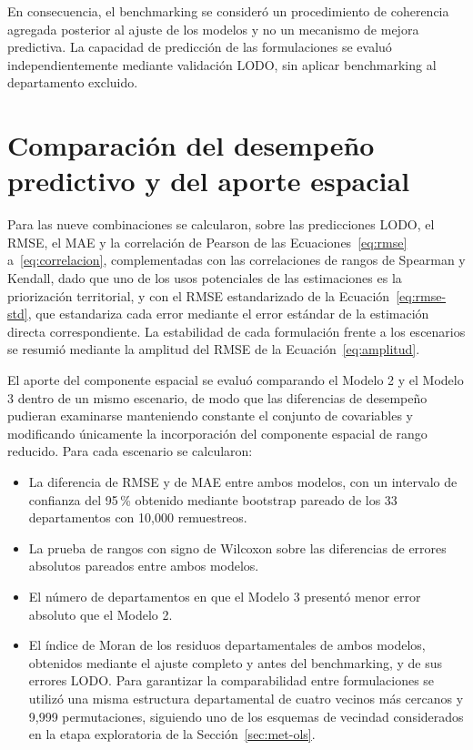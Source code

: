 En consecuencia, el benchmarking se consideró un procedimiento de coherencia agregada posterior al ajuste de los modelos y no un mecanismo de mejora predictiva. La capacidad de predicción de las formulaciones se evaluó independientemente mediante validación LODO, sin aplicar benchmarking al departamento excluido.


\section{Comparación del desempeño predictivo y del aporte espacial}
\label{sec:met-comparacion}

Para las nueve combinaciones se calcularon, sobre las predicciones LODO, el RMSE, el MAE y la correlación de Pearson de las Ecuaciones~\ref{eq:rmse} a~\ref{eq:correlacion}, complementadas con las correlaciones de rangos de Spearman y Kendall, dado que uno de los usos potenciales de las estimaciones es la priorización territorial, y con el RMSE estandarizado de la Ecuación~\ref{eq:rmse-std}, que estandariza cada error mediante el error estándar de la estimación directa correspondiente. La estabilidad de cada formulación frente a los escenarios se resumió mediante la amplitud del RMSE de la Ecuación~\ref{eq:amplitud}.

El aporte del componente espacial se evaluó comparando el Modelo 2 y el Modelo 3 dentro de un mismo escenario, de modo que las diferencias de desempeño pudieran examinarse manteniendo constante el conjunto de covariables y modificando únicamente la incorporación del componente espacial de rango reducido. Para cada escenario se calcularon:

\begin{itemize}
    \item La diferencia de RMSE y de MAE entre ambos modelos, con un intervalo de confianza del 95\,\% obtenido mediante bootstrap pareado de los 33 departamentos con 10{,}000 remuestreos.

    \item La prueba de rangos con signo de Wilcoxon sobre las diferencias de errores absolutos pareados entre ambos modelos.

    \item El número de departamentos en que el Modelo 3 presentó menor error absoluto que el Modelo 2.

    \item El índice de Moran de los residuos departamentales de ambos modelos, obtenidos mediante el ajuste completo y antes del benchmarking, y de sus errores LODO. Para garantizar la comparabilidad entre formulaciones se utilizó una misma estructura departamental de cuatro vecinos más cercanos y 9{,}999 permutaciones, siguiendo uno de los esquemas de vecindad considerados en la etapa exploratoria de la Sección~\ref{sec:met-ols}.
\end{itemize}

